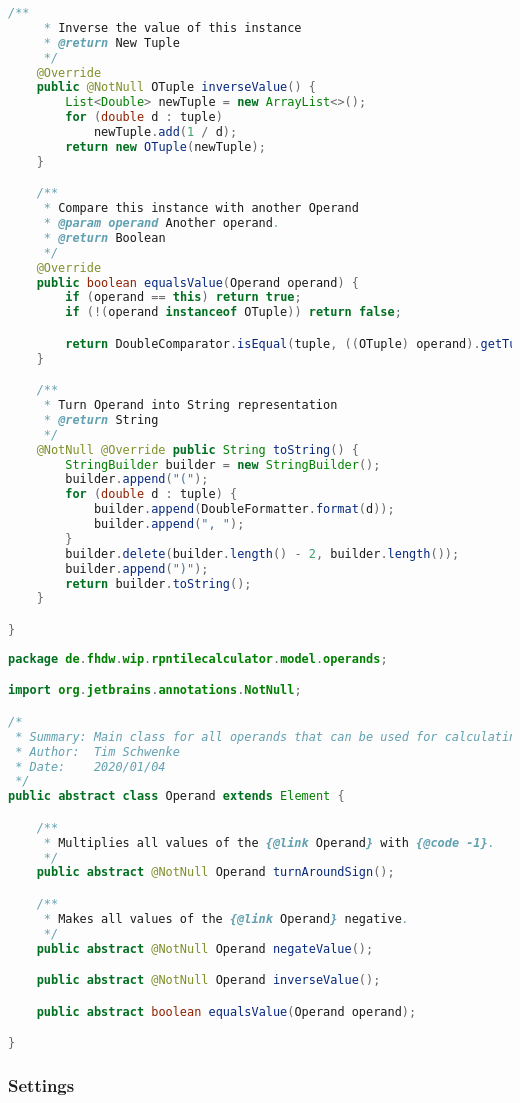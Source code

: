 \begin{lstlisting}[caption=OTuple (Schwenke),label=list:OTuple,language=Java]
    /**
     * Inverse the value of this instance
     * @return New Tuple
     */
    @Override
    public @NotNull OTuple inverseValue() {
        List<Double> newTuple = new ArrayList<>();
        for (double d : tuple)
            newTuple.add(1 / d);
        return new OTuple(newTuple);
    }

    /**
     * Compare this instance with another Operand
     * @param operand Another operand.
     * @return Boolean
     */
    @Override
    public boolean equalsValue(Operand operand) {
        if (operand == this) return true;
        if (!(operand instanceof OTuple)) return false;

        return DoubleComparator.isEqual(tuple, ((OTuple) operand).getTuple());
    }

    /**
     * Turn Operand into String representation
     * @return String
     */
    @NotNull @Override public String toString() {
        StringBuilder builder = new StringBuilder();
        builder.append("(");
        for (double d : tuple) {
            builder.append(DoubleFormatter.format(d));
            builder.append(", ");
        }
        builder.delete(builder.length() - 2, builder.length());
        builder.append(")");
        return builder.toString();
    }

}
\end{lstlisting}    

\begin{lstlisting}[caption=Operand (Schwenke),label=list:Operand,language=Java]
package de.fhdw.wip.rpntilecalculator.model.operands;

import org.jetbrains.annotations.NotNull;

/*
 * Summary: Main class for all operands that can be used for calculating
 * Author:  Tim Schwenke
 * Date:    2020/01/04
 */
public abstract class Operand extends Element {

    /**
     * Multiplies all values of the {@link Operand} with {@code -1}.
     */
    public abstract @NotNull Operand turnAroundSign();

    /**
     * Makes all values of the {@link Operand} negative.
     */
    public abstract @NotNull Operand negateValue();

    public abstract @NotNull Operand inverseValue();

    public abstract boolean equalsValue(Operand operand);

}
\end{lstlisting}    

\subsubsection{Settings}

